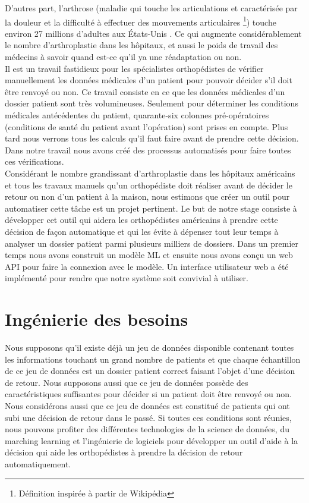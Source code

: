 \documentclass[12pt, french]{report}
\begin{document}
D'autres part, l'arthrose (maladie qui touche les articulations et caractérisée par la douleur et la difficulté à effectuer des mouvements articulaires \footnote{Définition inspirée à partir de Wikipédia}) touche environ 27 millions d'adultes aux États-Unis \cite{key11}.  Ce qui augmente considérablement le nombre d'arthroplastie dans les hôpitaux, et aussi le poids de travail des médecins à savoir quand est-ce qu'il ya une réadaptation ou non.\\

Il est un travail fastidieux pour les spécialistes orthopédistes de vérifier manuellement les données médicales d'un patient pour pouvoir décider s'il doit être renvoyé ou non. Ce travail consiste en ce que les données médicales d'un dossier patient sont très volumineuses. Seulement pour déterminer les conditions médicales antécédentes du patient, quarante-six colonnes pré-opératoires (conditions de santé du patient avant l'opération) sont prises en compte. Plus tard nous verrons tous les calculs qu'il faut faire avant de prendre cette décision. Dans notre travail nous avons créé des processus automatisés pour faire toutes ces vérifications.  \\

Considérant le nombre grandissant d'arthroplastie dans les hôpitaux américains et tous les travaux manuels qu'un orthopédiste doit réaliser avant de décider le retour ou non d'un patient à la maison, nous estimons que créer un outil pour automatiser cette tâche est un projet pertinent. Le but de notre stage consiste à développer cet outil qui aidera les orthopédistes américains à prendre cette décision de façon automatique et qui les évite à dépenser tout leur temps à analyser un dossier patient parmi plusieurs milliers de dossiers. Dans un premier temps nous avons construit un modèle ML et ensuite nous avons conçu un web API pour faire la connexion avec le modèle. Un interface utilisateur web a été implémenté pour rendre que notre système soit convivial à utiliser.\\

\section{Ingénierie des besoins}

Nous supposons qu'il existe déjà un jeu de données disponible contenant toutes les informations touchant un grand nombre de patients et que chaque échantillon de ce jeu de données est un dossier patient correct faisant l'objet d'une décision de retour. Nous supposons aussi que ce jeu de données possède des caractéristiques suffisantes pour décider si un patient doit être renvoyé ou non. Nous considérons aussi que ce jeu de données est constitué de patients qui ont subi une décision de retour dans le passé. Si toutes ces conditions sont réunies, nous pouvons profiter des différentes technologies de la science de données, du marching learning et l'ingénierie de logiciels pour développer un outil d'aide à la décision qui aide les orthopédistes à prendre la décision de retour automatiquement. \\
\end{document}
